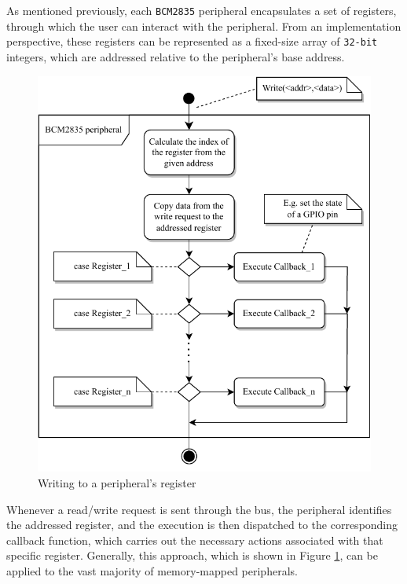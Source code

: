 \documentclass[english, ing, kiv, he, iso690numb, pdf]{fasthesis}
\begin{document}
	As mentioned previously, each \texttt{BCM2835} peripheral encapsulates a set of registers, through which the user can interact with the peripheral. From an implementation perspective, these registers can be represented as a fixed-size array of \texttt{32-bit} integers, which are addressed relative to the peripheral's base address.
	
	\begin{figure}[ht]
		\centering
		\includegraphics[width=.74\textwidth]{img/diagrams/memory_mapped_regs.pdf}
		\caption{Writing to a peripheral's register\protect\footnotemark}
		\label{Writing to a peripheral's register}
	\end{figure}
	
	
	Whenever a read/write request is sent through the bus, the peripheral identifies the addressed register, and the execution is then dispatched to the corresponding callback function, which carries out the necessary actions associated with that specific register. Generally, this approach, which is shown in Figure \ref{Writing to a peripheral's register}, can be applied to the vast majority of memory-mapped peripherals. 
	
\end{document}
